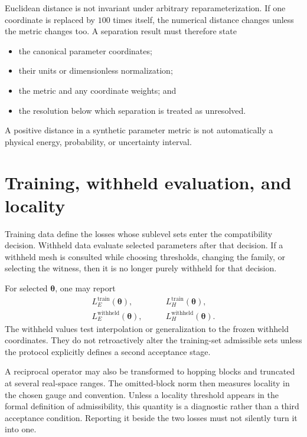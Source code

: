 Euclidean distance is not invariant under arbitrary reparameterization. If one
coordinate is replaced by $100$ times itself, the numerical distance changes
unless the metric changes too. A separation result must therefore state
\begin{itemize}
  \item the canonical parameter coordinates;
  \item their units or dimensionless normalization;
  \item the metric and any coordinate weights; and
  \item the resolution below which separation is treated as unresolved.
\end{itemize}
A positive distance in a synthetic parameter metric is not automatically a
physical energy, probability, or uncertainty interval.

\section{Training, withheld evaluation, and locality}

Training data define the losses whose sublevel sets enter the compatibility
decision. Withheld data evaluate selected parameters after that decision. If a
withheld mesh is consulted while choosing thresholds, changing the family, or
selecting the witness, then it is no longer purely withheld for that decision.

For selected $\boldsymbol\theta$, one may report
\begin{align}
  L_E^{\mathrm{train}}(\boldsymbol\theta),
  &\qquad
  L_H^{\mathrm{train}}(\boldsymbol\theta),\\
  L_E^{\mathrm{withheld}}(\boldsymbol\theta),
  &\qquad
  L_H^{\mathrm{withheld}}(\boldsymbol\theta).
\end{align}
The withheld values test interpolation or generalization to the frozen
withheld coordinates. They do not retroactively alter the training-set
admissible sets unless the protocol explicitly defines a second acceptance
stage.

A reciprocal operator may also be transformed to hopping blocks and truncated
at several real-space ranges. The omitted-block norm then measures locality in
the chosen gauge and convention. Unless a locality threshold appears in the
formal definition of admissibility, this quantity is a diagnostic rather than
a third acceptance condition. Reporting it beside the two losses must not
silently turn it into one.

